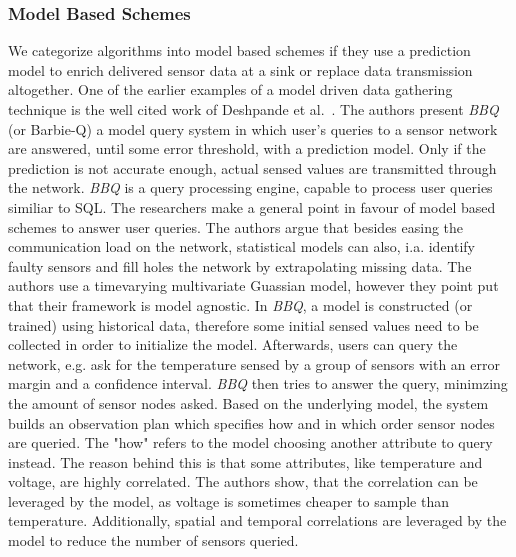 \subsubsection{Model Based Schemes}
\label{sec:Model Based Schemes}

We categorize algorithms into model based schemes if they use a prediction
model to enrich delivered sensor data at a sink or replace data transmission
altogether. One of the earlier examples of a model driven data gathering
technique is the well cited work of Deshpande et al.~\cite{deshpande2004model}.
The authors present \textit{BBQ} (or Barbie-Q) a model query system in which
user's queries to a sensor network are answered, until some error threshold,
with a prediction model. Only if the prediction is not accurate enough, actual
sensed values are transmitted through the network. \textit{BBQ} is a query
processing engine, capable to process user queries similiar to \ac{SQL}. The
researchers make a general point in favour of model based schemes to answer
user queries. The authors argue that besides easing the communication load on
the network, statistical models can also, i.a. identify faulty sensors and fill
holes the network by extrapolating missing data. The authors use a timevarying
multivariate Guassian model, however they point put that their framework is
model agnostic. In \textit{BBQ}, a model is constructed (or trained) using
historical data, therefore some initial sensed values need to be collected in
order to initialize the model. Afterwards, users can query the network, e.g.
ask for the temperature sensed by a group of sensors with an error margin and a
confidence interval. \textit{BBQ} then tries to answer the query, minimzing the
amount of sensor nodes asked. Based on the underlying model, the system builds
an observation plan which specifies how and in which order sensor nodes are
queried. The "how" refers to the model choosing another attribute to query
instead. The reason behind this is that some attributes, like temperature and
voltage, are highly correlated. The authors show, that the correlation can be
leveraged by the model, as voltage is sometimes cheaper to sample than
temperature. Additionally, spatial and temporal correlations are leveraged by
the model to reduce the number of sensors queried.

